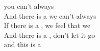   you can't always  \\
And there is a  we can't always  \\
If there is a , we feel that we  \\
And there is a , don't let it go  \\
and this is a